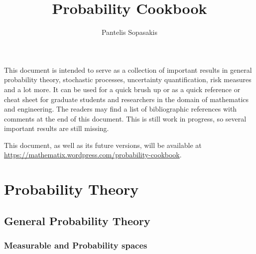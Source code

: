 \documentclass[a4paper,10pt]{scrbook}
\title{Probability Cookbook}
\author{Pantelis Sopasakis}
\begin{document}
\maketitle
\tableofcontents

  This document is intended to serve as a collection of important results in general probability
  theory, stochastic processes, uncertainty quantification, risk measures and a lot more.
  It can be used for a quick brush up or as a quick reference or 
  cheat sheet for graduate students and researchers in the domain of mathematics and 
  engineering. 
  The readers may find a list of bibliographic references with comments at the end
  of this document. This is still work in progress, so several important results are 
  still missing.
  
  This document, as well as its future versions, will be available at 
  \url{https://mathematix.wordpress.com/probability-cookbook}. 

\chapter{Probability Theory}
\section{General Probability Theory}

\subsection{Measurable and Probability spaces}
\end{document}
